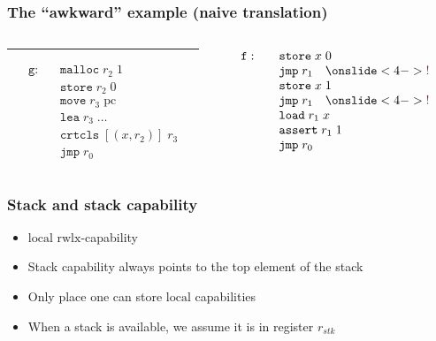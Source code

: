 \documentclass{beamer}
\newcommand{\var}[1]{\mathit{#1}}
\newcommand{\pcreg}{\mathrm{pc}}
\newcommand{\stk}{\var{stk}}
\newcommand{\plaindom}[1]{\mathrm{#1}}
\newcommand{\zinstr}[1]{\mathtt{#1}}
\newcommand{\oneinstr}[2]{\zinstr{#1} \; #2}
\newcommand{\jmp}[1]{\oneinstr{jmp}{#1}}
\newcommand{\twoinstr}[3]{\zinstr{#1} \; #2 \; #3}
\newcommand{\move}[2]{\twoinstr{move}{#1}{#2}}
\newcommand{\store}[2]{\twoinstr{store}{#1}{#2}}
\newcommand{\load}[2]{\twoinstr{load}{#1}{#2}}
\newcommand{\lea}[2]{\twoinstr{lea}{#1}{#2}}
\newcommand{\plainperm}[1]{\mathrm{#1}}
\newcommand{\rwlx}{\plainperm{rwlx}}
\newcommand{\local}{\plainperm{local}}
\begin{document}
\begin{frame}
 \frametitle{The ``awkward'' example (naive translation)}
 \begin{columns}
 \begin{column}{0.45\textwidth}
   \usebox{\awkwardex}
\rule{\textwidth}{0.4pt}
\[
  \begin{array}{lcl}
\mathtt{g}:
  &  &\mathtt{malloc} \; r_2 \; 1\\
  &  &\store{r_2}{0}\\
  &  &\move{r_3}{\pcreg}\\
  &  &\lea{r_3}{\dots}\\
  &  &\mathtt{crtcls} \;[(x, r_2)] \; r_3\\
  &  &\jmp{r_0}
  \end{array}
\]
 \end{column}
 \begin{column}{0.45\textwidth}
\[
\begin{array}{lcl}
\mathtt{f:}
  &  &\store{x}{0}\\
  &  &\jmp{r_1} \quad \onslide<4->{\color{red} !} \\ %
  &  &\store{x}{1}\\
  &  &\jmp{r_1} \quad \onslide<4->{\color{red} !}\\ %
  &  &\load{r_1}{x}\\
  &  &\mathtt{assert} \; r_1 \; 1\\
  &  &\jmp{r_0}
  \end{array}
\]
 \end{column}
\end{columns}
\end{frame}

\begin{frame}
  \frametitle{Stack and stack capability}
  \begin{itemize}[<+->]
  \item $\local$ $\rwlx$-capability
  \item Stack capability always points to the top element of the stack
  \item Only place one can store $\local$ capabilities
  \item When a stack is available, we assume it is in register $r_\stk$
  \end{itemize}
\end{frame}
\end{document}
